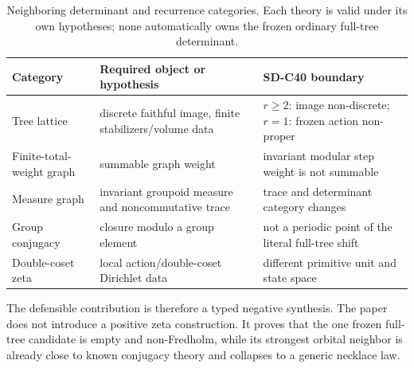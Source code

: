 \begin{table}[t]
\centering
\small
\caption{Neighboring determinant and recurrence categories.  Each theory is
valid under its own hypotheses; none automatically owns the frozen ordinary
full-tree determinant.}
\label{tab:literature-objects}
\begin{tabularx}{\textwidth}{L{3.1cm}YY}
\toprule
Category & Required object or hypothesis & SD-C40 boundary \\
\midrule
Tree lattice & discrete faithful image, finite stabilizers/volume data &
$r\ge2$: image non-discrete; $r=1$: frozen action non-proper \\
Finite-total-weight graph & summable graph weight & invariant modular step
weight is not summable \\
Measure graph & invariant groupoid measure and noncommutative trace & trace
and determinant category changes \\
Group conjugacy & closure modulo a group element & not a periodic point of
the literal full-tree shift \\
Double-coset zeta & local action/double-coset Dirichlet data & different
primitive unit and state space \\
\bottomrule
\end{tabularx}
\end{table}

The defensible contribution is therefore a typed negative synthesis.  The
paper does not introduce a positive zeta construction.  It proves that the
one frozen full-tree candidate is empty and non-Fredholm, while its strongest
orbital neighbor is already close to known conjugacy theory and collapses to
a generic necklace law.

